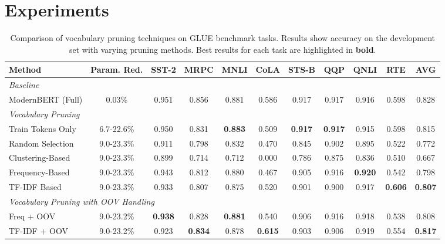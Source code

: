 \documentclass[twocolumn]{article}
\begin{document}
\newpage
\section{Experiments}

\begin{table*}[ht!]
\centering
\small
\caption{Comparison of vocabulary pruning techniques on GLUE benchmark tasks. Results show accuracy on the development set with varying pruning methods. Best results for each task are highlighted in \textbf{bold}.}
\label{tab:results}
\setlength{\tabcolsep}{4pt}
\begin{tabular}{lccccccccc|c}
\toprule
\textbf{Method} & \textbf{Param. Red.} & \textbf{SST-2} & \textbf{MRPC} & \textbf{MNLI} & \textbf{CoLA} & \textbf{STS-B} & \textbf{QQP} & \textbf{QNLI} & \textbf{RTE} & \textbf{AVG} \\
\midrule
\multicolumn{11}{l}{\textit{Baseline}} \\
ModernBERT (Full) & 0.03\% & 0.951 & 0.856 & 0.881 & 0.586 & 0.917 & 0.917 & 0.916 & 0.598 & 0.828 \\
\midrule
\multicolumn{11}{l}{\textit{Vocabulary Pruning}} \\
Train Tokens Only & 6.7-22.6\% & 0.950 & 0.831 & \textbf{0.883} & 0.509 & \textbf{0.917} & \textbf{0.917} & 0.915 & 0.598 & 0.815 \\
\midrule
Random Selection & 9.0-23.3\% & 0.911 & 0.798 & 0.832 & 0.470 & 0.845 & 0.902 & 0.895 & 0.522 & 0.772 \\
Clustering-Based & 9.0-23.3\% & 0.899 & 0.714 & 0.712 & 0.000 & 0.786 & 0.875 & 0.836 & 0.510 & 0.667 \\
Frequency-Based & 9.0-23.3\% & 0.943 & 0.812 & 0.880 & 0.467 & 0.905 & 0.916 & \textbf{0.920} & 0.542 & 0.798 \\
TF-IDF Based & 9.0-23.3\% & 0.933 & 0.807 & 0.875 & 0.520 & 0.901 & 0.900 & 0.917 & \textbf{0.606} & \textbf{0.807} \\
\midrule
\multicolumn{11}{l}{\textit{Vocabulary Pruning with OOV Handling}} \\
Freq + OOV & 9.0-23.2\% & \textbf{0.938} & 0.828 & \textbf{0.881} & 0.540 & 0.906 & 0.916 & 0.918 & 0.538 & 0.808 \\
TF-IDF + OOV & 9.0-23.2\% & 0.923 & \textbf{0.834} & 0.878 & \textbf{0.615} & 0.903 & 0.906 & 0.919 & 0.554 & \textbf{0.817} \\
\bottomrule
\end{tabular}
\end{table*}
\end{document}
